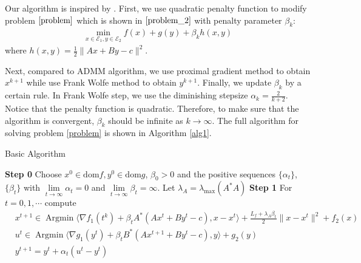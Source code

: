 \documentclass{article}
\numberwithin{equation}{section}
\def\Argmin{\mathop{\mathrm{Argmin}}}
\begin{document}
Our algorithm is inspired by \cite{yu2020rc}. First, we use quadratic 
penalty function to modify  problem $\eqref{problem}$ which is shown in $\eqref{problem_2}$ 
with penalty parameter $\beta_k$:
\begin{align}
    \min\limits_{x\in \mathcal{E}_1,y \in \mathcal{E}_2} f(x) + g(y) + \beta_k h(x,y) 
    \label{problem_2}
\end{align}
where $h(x,y) = \frac{1}{2}\|Ax+ By-c \rVert^2$.

Next, compared to ADMM algorithm, we use proximal gradient method to obtain $x^{k+1}$ while use Frank
Wolfe method to obtain $y^{k+1}$. Finally, we update $\beta_k$ by a certain rule. In Frank Wolfe step, we use the diminishing 
stepsize $\alpha_k = \frac{2}{k+2}$. Notice that the penalty function 
is quadratic. Therefore, to make sure that the algorithm is convergent, $\beta_k$ should be infinite 
as $k\rightarrow \infty$. The full algorithm for solving problem \eqref{problem} is shown in Algorithm \ref{alg1}.


\begin{algorithm}
	\caption{Basic Algorithm}
	\label{alg1}
	\begin{algorithmic}
		\STATE \textbf{Step 0} Choose $x^0 \in \mathrm{dom} f, y^0 \in \mathrm{dom} g$, $\beta_0>0$ and the positive sequences $\{\alpha_t\}$, $\{\beta_t\}$ 
        with $\lim\limits_{t\rightarrow\infty}\alpha_t=0$ and $\lim\limits_{t\rightarrow \infty}\beta_t=\infty $. 
        Let $\lambda_{A}=\lambda_{\max}(A^*A)$
		\STATE \textbf{Step 1} For $t=0,1,\cdots$ compute   
            \begin{align}
                &x^{t+1} \in \Argmin \langle \nabla f_1(t^k) + \beta_{t}A^*(Ax^t+By^t-c), x-x^t\rangle +\frac{L_f+\lambda_A \beta_t}{2}\|x-x^t\rVert^2 +f_2(x) \label{get_x_k} \\
                &u^t \in \Argmin \langle\nabla g_1(y^t) + \beta_{t}B^*(Ax^{t+1} +By^t-c),y\rangle +g_2(y) \label{get_uk} \\
                &y^{t+1} = y^{t} +\alpha_t(u^t-y^t)  \label{get_y_k}
            \end{align}
	\end{algorithmic}  
\end{algorithm}
\end{document}

